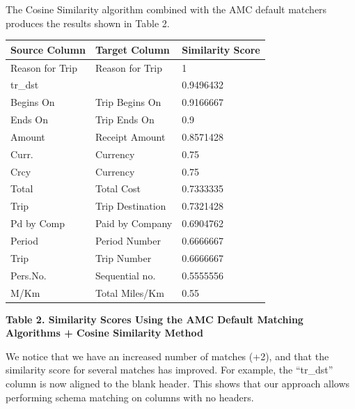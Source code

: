 \documentclass{sig-alternate}
\begin{document}
The Cosine Similarity algorithm combined with the AMC default matchers produces the results shown in Table 2.

\begin{tabular}{|p{0.7in}|p{0.8in}|p{0.8in}|} \hline 
\textbf{Source Column} & \textbf{Target Column} & \textbf{Similarity Score} \\ \hline 
Reason for Trip & Reason for Trip & 1 \\ \hline 
tr\_dst &  & 0.9496432 \\ \hline 
Begins On & Trip Begins On & 0.9166667 \\ \hline 
Ends On & Trip Ends On & 0.9 \\ \hline 
Amount & Receipt Amount & 0.8571428 \\ \hline 
Curr. & Currency & 0.75 \\ \hline 
Crcy & Currency & 0.75 \\ \hline 
Total & Total Cost & 0.7333335 \\ \hline 
Trip & Trip Destination & 0.7321428 \\ \hline 
Pd by Comp & Paid by Company & 0.6904762 \\ \hline 
Period & Period Number & 0.6666667 \\ \hline 
Trip & Trip Number & 0.6666667 \\ \hline 
Pers.No. & Sequential no. & 0.5555556 \\ \hline 
M/Km & Total Miles/Km & 0.55 \\ \hline 
\end{tabular}



\textbf{Table 2. Similarity Scores Using the AMC Default Matching Algorithms + Cosine Similarity Method}

We notice that we have an increased number of matches (+2), and that the similarity score for several matches has improved. For example, the ``tr\_dst'' column is now aligned to the blank header. This shows that our approach allows performing schema matching on columns with no headers. 
\end{document}
